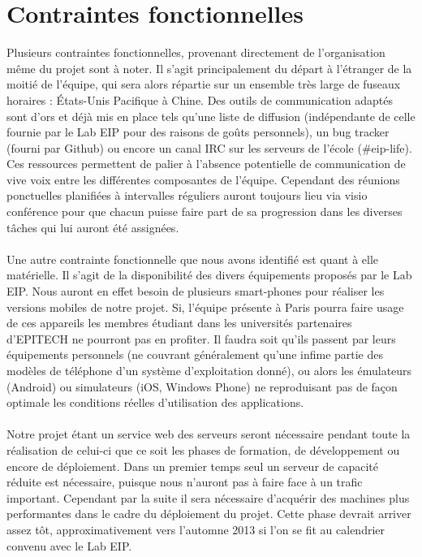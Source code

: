 \documentclass{life-fr}
\begin{document}
\section{Contraintes fonctionnelles}

Plusieurs contraintes fonctionnelles, provenant directement de l'organisation même du projet sont à noter. Il s'agit principalement du départ à l'étranger de la moitié de l'équipe, qui sera alors répartie sur un ensemble très large de fuseaux horaires : États-Unis Pacifique à Chine. Des outils de communication adaptés sont d'ors et déjà mis en place tels qu'une liste de diffusion (indépendante de celle fournie par le Lab EIP pour des raisons de goûts personnels), un bug tracker (fourni par Github) ou encore un canal IRC sur les serveurs de l'école (\#eip-life). Ces ressources permettent de palier à l'absence potentielle de communication de vive voix entre les différentes composantes de l'équipe. Cependant des réunions ponctuelles planifiées à intervalles réguliers auront toujours lieu via visio conférence pour que chacun puisse faire part de sa progression dans les diverses tâches qui lui auront été assignées.\\
\\
Une autre contrainte fonctionnelle que nous avons identifié est quant à elle matérielle. Il s'agit de la disponibilité des divers équipements proposés par le Lab EIP. Nous auront en effet besoin de plusieurs smart-phones pour réaliser les versions mobiles de notre projet. Si, l'équipe présente à Paris pourra faire usage de ces appareils les membres étudiant dans les universités partenaires d'EPITECH ne pourront pas en profiter. Il faudra soit qu'ils passent par leurs équipements personnels (ne couvrant généralement qu'une infime partie des modèles de téléphone d'un système d'exploitation donné), ou alors les émulateurs (Android) ou simulateurs (iOS, Windows Phone) ne reproduisant pas de façon optimale les conditions réelles d'utilisation des applications.\\
\\
Notre projet étant un service web des serveurs seront nécessaire pendant toute la réalisation de celui-ci que ce soit les phases de formation, de développement ou encore de déploiement. Dans un premier temps seul un serveur de capacité réduite est nécessaire, puisque nous n'auront pas à faire face à un trafic important. Cependant par la suite il sera nécessaire d'acquérir des machines plus performantes dans le cadre du déploiement du projet. Cette phase devrait arriver assez tôt, approximativement vers l'automne 2013 si l'on se fit au calendrier convenu avec le Lab EIP.\\
\end{document}
